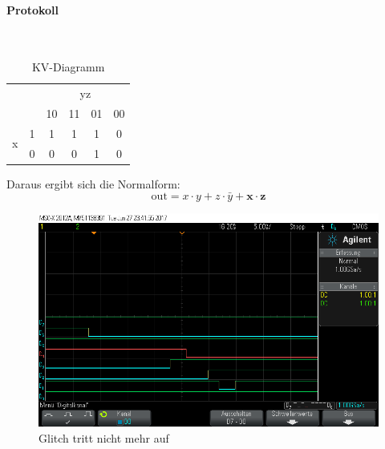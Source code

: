 \documentclass[10pt]{scrreprt}
\begin{document}
    \paragraph{Protokoll}
    $ $

    \begin{table}
        \centering
        \begin{tabular}{cc|cccc}
            & &  & \multicolumn{2}{c}{yz}\\
            & & 10 & 11 & 01 & 00\\
            \midrule
            \multirow{ 2}{*}{x} & 1 & 1 & 1 & 1 & 0\\
             & 0 & 0 & 0 & 1 & 0\\
        \end{tabular}
        \caption{KV-Diagramm}
    \end{table}

    Daraus ergibt sich die Normalform:
    \begin{equation*}
        \text{out} = x \cdot y + z \cdot \bar{y} + \mathbf{x \cdot z}
    \end{equation*}

    \begin{figure}[H]
        \includegraphics[width=\textwidth]{scope_13.png}
        \caption{Glitch tritt nicht mehr auf}
    \end{figure}
\end{document}
